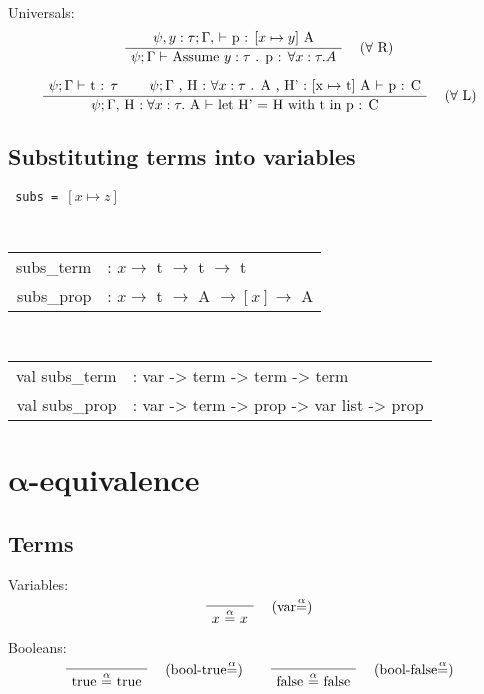 \documentclass[twoside,a4paper]{article}
\theoremstyle{definition}
\begin{document}
Universals:
\[
\AxiomC{$\psi , y : \tau  ; \Gamma , $ $\vdash$ p : [$x \mapsto y$] A}
\RightLabel{\quad ($\forall$ R)}
\UnaryInfC{$\psi ; \Gamma \vdash$ Assume $y:\tau$ . p : $\forall x : \tau . A $}
\DisplayProof
\]

\[
\AxiomC{$\psi ; \Gamma \vdash$ t : $\tau$}
\AxiomC{$\psi ; \Gamma$ ,
H : $\forall x : \tau $ . A ,
H' : [x $\mapsto$ t] A  $\vdash$ p : C}
\RightLabel{\quad ($\forall$ L)}
\BinaryInfC{$\psi ; \Gamma , $ H $:\forall x:\tau. $ A $ \vdash$
let H' = H with t in p : C}
\DisplayProof
\]

\subsection{Substituting terms into variables}

\begin{center}
{\tt
subs = $[x \mapsto z]$
}
\end{center}

\begin{center}
{\tt
\begin{tabular}{rl}
subs_term &: $x \rightarrow $ t $ \rightarrow $ t $\rightarrow$ t
\\
subs_prop &: $x\rightarrow$ t $\rightarrow$ A $\rightarrow[x]\rightarrow$ A
\end{tabular}
}
\end{center}

\begin{center}
{\tt
\begin{tabular}{rl}
val subs_term &: var -> term -> term -> term
\\
val subs_prop &: var -> term -> prop -> var list -> prop
\end{tabular}
}
\end{center}

\section{$\boldsymbol \alpha$-equivalence}
\subsection{Terms}

Variables:
\[
\AxiomC{}
\RightLabel{\quad (var$\overset{\alpha}=$)}
\UnaryInfC{$x$ $\overset{\alpha}=$ $x$}
\DisplayProof
\]

Booleans:
\[
\AxiomC{}
\RightLabel{\quad (bool-true$\overset{\alpha}=$)}
\UnaryInfC{true $\overset{\alpha}=$ true}
\DisplayProof
\quad
\quad
\AxiomC{}
\RightLabel{\quad (bool-false$\overset{\alpha}=$)}
\UnaryInfC{false $\overset{\alpha}=$ false}
\DisplayProof
\]
\end{document}
